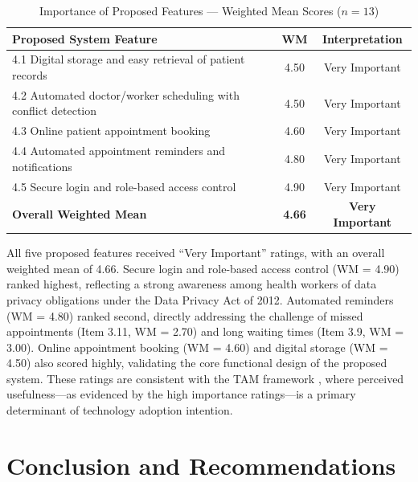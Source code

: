 \documentclass{research}
\begin{document}
\begin{table}[H]
  \centering
  \caption{Importance of Proposed Features --- Weighted Mean Scores ($n = 13$)}
  \label{tab:features}
  \begin{tabular}{p{9cm}cc}
    \toprule
    \textbf{Proposed System Feature} & \textbf{WM} & \textbf{Interpretation} \\
    \midrule
    4.1 Digital storage and easy retrieval of patient records     & 4.50 & Very Important \\
    4.2 Automated doctor/worker scheduling with conflict detection & 4.50 & Very Important \\
    4.3 Online patient appointment booking                         & 4.60 & Very Important \\
    4.4 Automated appointment reminders and notifications          & 4.80 & Very Important \\
    4.5 Secure login and role-based access control                 & 4.90 & Very Important \\
    \midrule
    \textbf{Overall Weighted Mean}                                 & \textbf{4.66} & \textbf{Very Important} \\
    \bottomrule
  \end{tabular}
\end{table}

All five proposed features received ``Very Important'' ratings, with an overall weighted mean of
4.66. Secure login and role-based access control (WM = 4.90) ranked highest, reflecting a strong
awareness among health workers of data privacy obligations under the Data Privacy Act of 2012.
Automated reminders (WM = 4.80) ranked second, directly addressing the challenge of missed
appointments (Item 3.11, WM = 2.70) and long waiting times (Item 3.9, WM = 3.00). Online
appointment booking (WM = 4.60) and digital storage (WM = 4.50) also scored highly, validating
the core functional design of the proposed system. These ratings are consistent with the TAM
framework \cite{TAM_Newcastle}, where perceived usefulness---as evidenced by the high importance
ratings---is a primary determinant of technology adoption intention.

\section{Conclusion and Recommendations}
\end{document}
